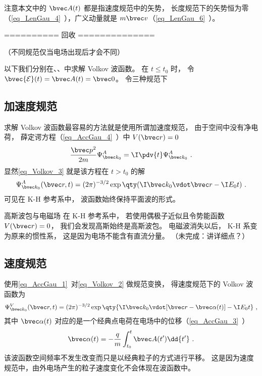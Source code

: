 注意本文中的 $\bvec A(t)$ 都是指速度规范中的矢势， 长度规范下的矢势恒为零（\autoref{eq_LenGau_4}~），广义动量就是 $m\bvec v$（\autoref{eq_LenGau_6}~）。

========== 回收 ==============


（不同规范仅当电场出现后才会不同）

以下我们分别在、、中求解 Volkov 波函数。 在 $t \le t_0$ 时， 令 $\bvec {\mathcal E}(t) = \bvec A(t) = \bvec 0$。 令三种规范下 




\subsection{加速度规范}
求解 Volkov 波函数最容易的方法就是使用所谓加速度规范， 由于空间中没有净电荷， 薛定谔方程（\autoref{eq_AccGau_4}~）中 $V(\bvec r) = 0$
\begin{equation}
\frac{\bvec p^2}{2m}\Psi_{\bvec k_0}^A = \I \pdv{t} \Psi_{\bvec k_0}^A~.
\end{equation}
显然\autoref{eq_Volkov_3} 就是该方程在 $t > t_0$ 的解
\begin{equation}\label{eq_Volkov_2}
\Psi_{\bvec k_0}^A(\bvec r, t) = (2\pi)^{-3/2} \exp\qty(\I\bvec k_0 \vdot \bvec r - \I E_0 t)~.
\end{equation}
可见在 K-H 参考系中， 波函数始终保持平面波的形式。

\begin{example}{高斯波包与电磁场}
在 K-H 参考系中， 若使用偶极子近似且令势能函数 $V(\bvec r) = 0$， 我们会发现高斯始终是高斯波包。 电磁波消失以后， K-H 系变为原来的惯性系， 这是因为电场不能含有直流分量。 （未完成：讲详细点？）
\end{example}

\subsection{速度规范}
使用\autoref{eq_AccGau_1}~对\autoref{eq_Volkov_2} 做规范变换， 得速度规范下的 Volkov 波函数为
\begin{equation}\label{eq_Volkov_1}
\Psi_{\bvec k_0}^V(\bvec r, t) = (2\pi)^{-3/2} \exp\qty{\I \bvec k_0 \vdot [\bvec r - \bvec \alpha(t)] - \I E_0 t}~,
\end{equation}
其中 $\bvec \alpha(t)$ 对应的是一个经典点电荷在电场中的位移（\autoref{eq_AccGau_3}~）
\begin{equation}
\bvec \alpha(t) = -\frac{q}{m} \int_{t_0}^t \bvec A(t') \dd{t'}~.
\end{equation}
该波函数空间频率不发生改变而只是以经典粒子的方式进行平移。 这是因为速度规范中，由外电场产生的粒子速度变化不会体现在波函数中。

